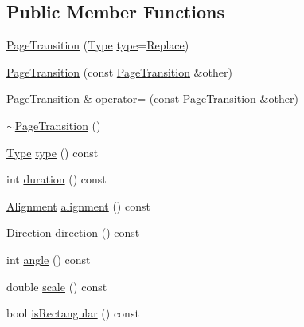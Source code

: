 \subsection*{Public Member Functions}
\begin{DoxyCompactItemize}
\item 
\hyperlink{classOkular_1_1PageTransition_aebcff8395e6cfc1f097ed2445004c93d}{Page\+Transition} (\hyperlink{classOkular_1_1PageTransition_a3e8b592a5a587ec0c3a9855d5d2687df}{Type} \hyperlink{classOkular_1_1PageTransition_a6978037265846c93fa891e903b9a73c6}{type}=\hyperlink{classOkular_1_1PageTransition_a3e8b592a5a587ec0c3a9855d5d2687dfa00b4174576812eb2e62e30e99c1dd0a4}{Replace})
\item 
\hyperlink{classOkular_1_1PageTransition_acf27262969b6f5eea3121e87811c60a4}{Page\+Transition} (const \hyperlink{classOkular_1_1PageTransition}{Page\+Transition} \&other)
\item 
\hyperlink{classOkular_1_1PageTransition}{Page\+Transition} \& \hyperlink{classOkular_1_1PageTransition_a33779d2e0134b594934473789383d895}{operator=} (const \hyperlink{classOkular_1_1PageTransition}{Page\+Transition} \&other)
\item 
\hyperlink{classOkular_1_1PageTransition_a6a7dd3215cb63628a5a40e8082a5f89a}{$\sim$\+Page\+Transition} ()
\item 
\hyperlink{classOkular_1_1PageTransition_a3e8b592a5a587ec0c3a9855d5d2687df}{Type} \hyperlink{classOkular_1_1PageTransition_a6978037265846c93fa891e903b9a73c6}{type} () const 
\item 
int \hyperlink{classOkular_1_1PageTransition_a313dcaa11f3432a6d5f184311b181fb1}{duration} () const 
\item 
\hyperlink{classOkular_1_1PageTransition_ab8b9f1414ab5aaf9d54c8952b0134ad9}{Alignment} \hyperlink{classOkular_1_1PageTransition_a8bfb7a26fa3d2ea4ac5554c7814a9167}{alignment} () const 
\item 
\hyperlink{classOkular_1_1PageTransition_a5b8bef87847dd9eef0c6b642180c93d9}{Direction} \hyperlink{classOkular_1_1PageTransition_aec8f5d80619b641f144a69b0b0eae5d8}{direction} () const 
\item 
int \hyperlink{classOkular_1_1PageTransition_abe85ca649285fbceef648aa5e095b971}{angle} () const 
\item 
double \hyperlink{classOkular_1_1PageTransition_abe49d76f577d43a115b2ff542e99f674}{scale} () const 
\item 
bool \hyperlink{classOkular_1_1PageTransition_a2ebab103cebcb665d8e06b81cf65f001}{is\+Rectangular} () const 

\end{DoxyCompactItemize}

